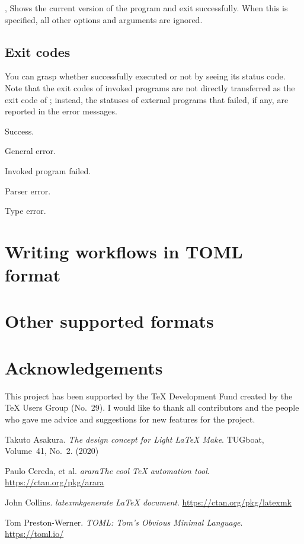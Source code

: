 \documentclass[draft]{llmk-doc}
\begin{document}
\begin{clopt}{, }
Shows the current version of the program and exit successfully. When this is
specified, all other options and arguments are ignored.
\end{clopt}

\subsection{Exit codes}

You can grasp whether  successfully executed or not by seeing its
status code. Note that the exit codes of invoked programs are not directly
transferred as the exit code of ; instead, the statuses of external
programs that failed, if any, are reported in the error messages.
%
\begin{description}[left=2em]
\item[\code{0}]
  Success.
\item[\code{1}]
  General error.
\item[\code{2}]
  Invoked program failed.
\item[\code{3}]
  Parser error.
\item[\code{4}]
  Type error.
\end{description}

\section{Writing workflows in TOML format}
\label{sec:toml}

\section{Other supported formats}
\label{sec:magic-comment}

\section{Acknowledgements}

This project has been supported by the {\TeX} Development Fund created by the {\TeX}
Users Group (No.~29). I would like to thank all contributors and the people who
gave me advice and suggestions for new features for the  project.

\begin{thebibliography}{9}
  Takuto Asakura. \textit{The design concept for \Dash Light {\LaTeX}
  Make}. TUGboat, Volume~41, No.~2. (2020)

  Paulo Cereda, et al. \textit{arara\Dash The cool {\TeX} automation
  tool}. \url{https://ctan.org/pkg/arara}

  John Collins. \textit{latexmk\Dash generate {\LaTeX} document}.
  \url{https://ctan.org/pkg/latexmk}

  Tom Preston-Werner. \textit{TOML: Tom's Obvious Minimal Language}.
  \url{https://toml.io/}
\end{thebibliography}
\end{document}
